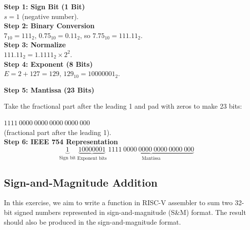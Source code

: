 \begin{minipage}[t]{0.45\textwidth}
\vspace*{5px}
\textbf{Step 1: Sign Bit (1 Bit)}\\  
\vspace*{5px}
\( s = 1 \) (negative number). \\
\vspace*{5px} 
\textbf{Step 2: Binary Conversion}\\  
\vspace*{5px}
\( 7_{10} = 111_2 \), \( 0.75_{10} = 0.11_2 \), so \( 7.75_{10} = 111.11_2 \). \\
\textbf{Step 3: Normalize}\\
\vspace*{5px}  
\( 111.11_2 = 1.1111_2 \times 2^2 \). \\
\vspace*{5px}
\textbf{Step 4: Exponent (8 Bits)}\\
\vspace*{5px}  
\( E = 2 + 127 = 129 \), \( 129_{10} = 10000001_2 \).
\end{minipage}
\hfill
\vline
\hfill
\begin{minipage}[t]{0.45\textwidth}

\textbf{Step 5: Mantissa (23 Bits)}\\
\vspace*{3px}  
\begin{justify}
    Take the fractional part after the leading 1 and pad with zeros to make 23 bits:
\end{justify} 
\( 1111 \ 0000 \ 0000 \ 0000 \ 0000 \ 000 \) \\
(fractional part after the leading 1). \\
\vspace*{3px}
\textbf{Step 6: IEEE 754 Representation}\\
\vspace*{3px}  
\[
\boxed{
  \underbrace{1}_{\text{Sign bit}} \ 
  \underbrace{10000001}_{\text{Exponent bits}} \ 
  \underbrace{1111 \ 0000 \ 0000 \ 0000 \ 0000 \ 000}_{\text{Mantissa}}
}
\]
\end{minipage}

\subsection{Sign-and-Magnitude Addition}

In this exercise, we aim to write a function in RISC-V assembler to sum two 32-bit signed numbers represented in sign-and-magnitude (S\&M) format. The result should also be produced in the sign-and-magnitude format.

